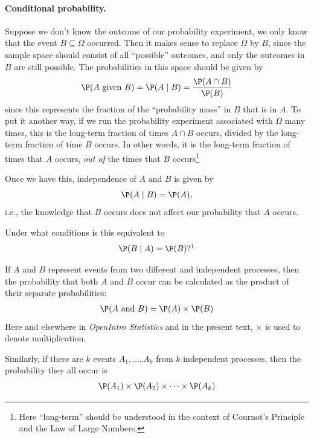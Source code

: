 \paragraph{Conditional probability.}
Suppose we don't know the outcome of our probability experiment, we only know that the event $B\subseteq\Omega$ occurred.
Then it makes sense to replace $\Omega$ by $B$, since the sample space should consist of all ``possible'' outcomes, and only the outcomes in $B$ are still possible.
The probabilities in this space should be given by
\[
	\P(A\text{ given }B) = \P(A\mid B) = \frac{\P(A\cap B)}{\P(B)}
\]
since this represents the fraction of the ``probability mass'' in $B$ that is in $A$. To put it another way, if we run the probability experiment associated with $\Omega$ many times, this is the long-term fraction of times $A\cap B$ occurs, divided by the long-term fraction of time $B$ occurs. In other words, it is the long-term fraction of times that $A$ occurs, \emph{out of} the times that $B$ occurs\footnote{Here ``long-term'' should be understood in the context of Cournot's Principle and the Law of Large Numbers.}

Once we have this, independence of $A$ and $B$ is given by
\[
	\P(A\mid B) = \P(A),
\]
i.e., the knowledge that $B$ occurs does not affect our probability that $A$ occurs.
\begin{exercise}
	Under what conditions is this equivalent to
	\[
		\P(B\mid A) = \P(B)?\footnote{If $\P(B)=0$ or $\P(A)=0$ then they cannot be equivalent, as they will not both be defined. However, once both probabilities are nonzero, both equations are just expressing that $\P(A\cap B)=\P(A)\P(B)$.}
	\]
\end{exercise}

\begin{termBox}{
If $A$ and $B$ represent events from two different and independent processes, then the probability that both $A$ and $B$ occur can be calculated as the product of their separate probabilities: \vspace{-1.5mm}
\begin{eqnarray}\label{eqForIndependentEvents}
\P(A \text{ and }B) = \P(A) \times  \P(B)
\end{eqnarray}
Here and elsewhere in \emph{OpenIntro Statistics} and in the present text, $\times$ is used to denote multiplication.

Similarly, if there are $k$ events $A_1,\dots,A_k$ from $k$ independent processes, then the probability they all occur is\vspace{-1.5mm}
\begin{eqnarray*}
\P(A_1) \times  \P(A_2)\times  \cdots \times  \P(A_k)
\end{eqnarray*}\vspace{-6mm}}
\end{termBox}


